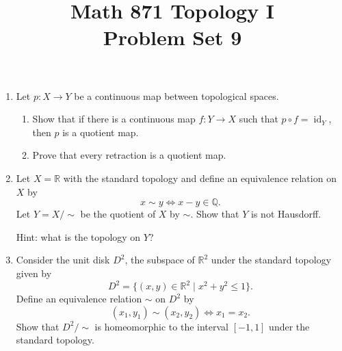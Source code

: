 \documentclass[12pt]{article}
\title{Math 871 Topology I \\ Problem Set 9}
\author{}
\date{}
\newcommand{\Q}{\mathbb{Q}}
\newcommand{\R}{\mathbb{R}}
\DeclareMathOperator{\id}{id}
\theoremstyle{definition}
\begin{document}
\maketitle


	
\thispagestyle{fancy}
\pagestyle{fancy}



\begin{enumerate}[roomy]

\item Let $p \colon X \longrightarrow Y$ be a continuous map between topological spaces.

\begin{enumerate}
\item Show that if there is a continuous map $f \colon Y \rightarrow X$ such that $p \circ f = \id_Y$, then $p$ is a quotient map.

\item Prove that every retraction is a quotient map. 
\end{enumerate}


\item Let $X = \R$ with the standard topology and define an equivalence relation on $X$ by
\[ x \sim y \iff x-y \in \Q.\]
Let $Y = X/\sim$ be the quotient of $X$ by $\sim$. Show that $Y$ is not Hausdorff.

\noindent
Hint: what is the topology on $Y$?


\item Consider the unit disk $D^2$, the subspace of $\R^2$ under the standard topology given by
\[ D^2 = \{ (x,y) \in \R^2 \mid x^2 + y^2 \leqslant 1 \}. \]
Define an equivalence relation $\sim$ on $D^2$ by
\[ (x_1, y_1) \sim (x_2, y_2) \iff x_1=x_2.\]
Show that $D^2/\sim$ is homeomorphic to the interval $[-1, 1]$ under the standard topology.

\end{enumerate}
\end{document}
